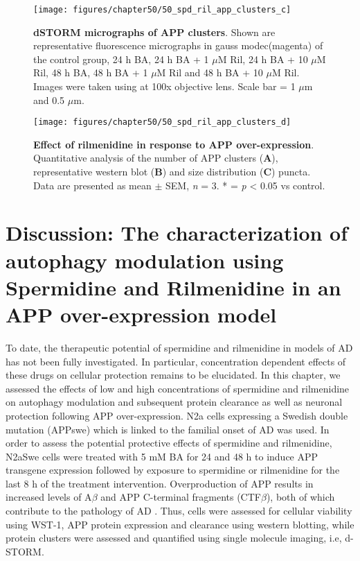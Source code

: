 \begin{landscape}
\begin{figure}[!htbp]
\center
  \texttt{[image: figures/chapter50/50\_spd\_ril\_app\_clusters\_c]}
  \caption[dSTORM micrographs of APP clusters]{\textbf{dSTORM micrographs of APP clusters}. Shown are representative fluorescence micrographs in gauss modec(magenta) of the control group, 24 h BA, 24 h BA + 1 $\mu$M Ril, 24 h BA + 10 $\mu$M Ril, 48 h BA, 48 h BA + 1 $\mu$M Ril and 48 h BA + 10 $\mu$M Ril. Images were taken using at 100x objective lens. Scale bar = 1 $\mu$m and 0.5 $\mu$m.}
  \label{fig:50_spd_ril_app_clusters_c}
\end{figure} 
\end{landscape}

\begin{landscape}
\begin{figure}[!htbp]
\center
  \texttt{[image: figures/chapter50/50\_spd\_ril\_app\_clusters\_d]}
  \caption[Effect of rilmenidine in response to APP over-expression]{\textbf{Effect of rilmenidine in response to APP over-expression}. Quantitative analysis of the number of APP clusters (\textbf{A}), representative western blot (\textbf{B}) and size distribution (\textbf{C}) puncta. Data are presented as mean $\pm$ SEM, \textit{n} = 3. * = \textit{p} < 0.05 vs control.}
  \label{fig:50_spd_ril_app_clusters_d}
\end{figure} 
\end{landscape}

\section{Discussion: The characterization of autophagy modulation using Spermidine and Rilmenidine in an APP over-expression model}
To date, the therapeutic potential of spermidine and rilmenidine in models of AD has not been fully investigated. In particular, concentration dependent effects of these drugs on cellular protection remains to be elucidated. In this chapter, we assessed the effects of low and high concentrations of spermidine and rilmenidine on autophagy modulation and subsequent protein clearance as well as neuronal protection following APP over-expression. N2a cells expressing a Swedish double mutation (APPswe) which is linked to the familial onset of AD was used. In order to assess the potential protective effects of spermidine and rilmenidine, N2aSwe cells were treated with 5 mM BA for 24 and 48 h to induce APP transgene expression followed by exposure to spermidine or rilmenidine for the last 8 h of the treatment intervention. Overproduction of APP results in increased levels of A$\beta$ and APP C-terminal fragments (CTF$\beta$), both of which contribute to the pathology of AD \citep{Walsh2007}. Thus, cells were assessed for cellular viability using WST-1, APP protein expression and clearance using western blotting, while protein clusters were assessed and quantified using single molecule imaging, i.e, d-STORM.

